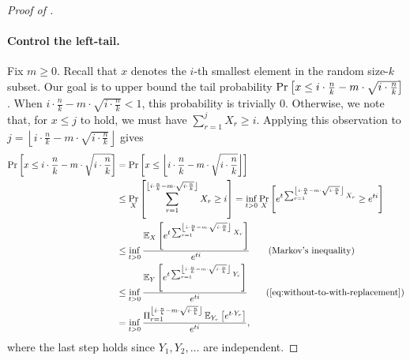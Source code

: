 \begin{proof}[Proof of ]
\paragraph{Control the left-tail.} Fix $m \ge 0$. Recall that $x$ denotes the $i$-th smallest element in the random size-$k$ subset. Our goal is to upper bound the tail probability $\Pr_{}\left[x \le i \cdot \frac{n}{k} - m\cdot\sqrt{i \cdot \frac{n}{k}}\right]$. When $i \cdot \frac{n}{k} - m\cdot\sqrt{i \cdot \frac{n}{k}} < 1$, this probability is trivially $0$. Otherwise, we note that, for $x \le j$ to hold, we must have $\sum_{r = 1}^j X_r \ge i$. Applying this observation to $j = \left\lfloor i\cdot \frac{n}{k} - m\cdot \sqrt{i\cdot \frac{n}{k}}\right\rfloor$ gives
\begin{align*}
        \pr{}{x \le i\cdot \frac{n}{k} - m\cdot \sqrt{i\cdot \frac{n}{k}}}
    &=  \pr{}{x \le \left\lfloor i\cdot \frac{n}{k} - m\cdot \sqrt{i\cdot \frac{n}{k}}\right\rfloor}\\
    &\le\pr{X}{\sum_{r=1}^{\left \lfloor i\cdot \frac{n}{k} - m\cdot \sqrt{i\cdot \frac{n}{k}}\right\rfloor } X_r \ge i}
    =   \inf_{t > 0}\pr{X}{e^{t\sum_{r=1}^{\left \lfloor i\cdot \frac{n}{k} - m\cdot \sqrt{i\cdot \frac{n}{k}}\right \rfloor }X_r} \ge e^{ti}}\\
    &\le\inf_{t>0}\frac{\Ex{X}{e^{t\sum_{r=1}^{\left \lfloor i\cdot \frac{n}{k} - m\cdot \sqrt{i\cdot \frac{n}{k}}\right \rfloor }X_r}}}{e^{ti}} \tag{Markov's inequality} \\
    &\le\inf_{t>0}\frac{\Ex{Y}{e^{t\sum_{r=1}^{\left \lfloor i\cdot \frac{n}{k} - m\cdot \sqrt{i\cdot \frac{n}{k}}\right \rfloor }Y_r}}}{e^{ti}} \tag{\Cref{eq:without-to-with-replacement}}\\
    &=  \inf_{t>0}\frac{\Pi_{r=1}^{\left \lfloor i\cdot \frac{n}{k} - m\cdot \sqrt{i\cdot \frac{n}{k}} \right \rfloor }\Ex{Y_r}{e^{t \cdot Y_r}}}{e^{ti}},
\end{align*}
where the last step holds since $Y_1, Y_2, \ldots$ are independent.


\end{proof}
